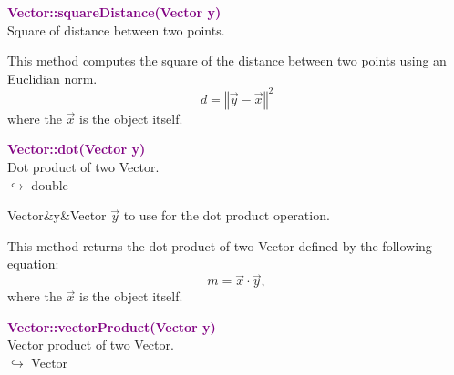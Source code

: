 \textcolor{purple}{\textbf{Vector::squareDistance(Vector y)}}\label{Vector::squareDistance(Vector y)}\\
Square of distance between two points.

This method computes the square of the distance between two points using an Euclidian norm.
\begin{equation*}
d = {\left\Vert \overrightarrow{y} - \overrightarrow{x} \right\Vert}^2
\end{equation*}
where the $\overrightarrow{x}$ is the object itself.

\textcolor{purple}{\textbf{Vector::dot(Vector y)}}\label{Vector::dot(Vector y)}\\
Dot product of two Vector.\\ \hspace*{10mm}$\hookrightarrow$ double

\begin{tcolorbox}[width=\textwidth,myArgs,tabularx={ll|R}]
Vector&y&Vector $\overrightarrow{y}$ to use for the dot product operation.
\end{tcolorbox}

This method returns the dot product of two Vector defined by the following equation:
\begin{equation*}
m = \overrightarrow{x}\cdot\overrightarrow{y},
\end{equation*}
where the $\overrightarrow{x}$ is the object itself.

\textcolor{purple}{\textbf{Vector::vectorProduct(Vector y)}}\label{Vector::vectorProduct(Vector y)}\\
Vector product of two Vector.\\ \hspace*{10mm}$\hookrightarrow$ Vector

